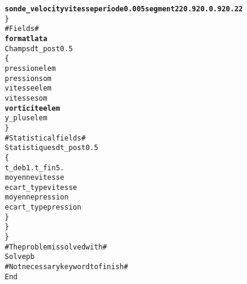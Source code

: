 \begin{alltt}
            {\bf{sonde_velocity  vitesse    periode 0.005   segment 22 0.92 0. 0.92 0.22 }}
        \} 
        # Fields # 
        {\bf{format lata }}
        Champs dt_post 0.5 
        \{ 
            pression elem 
            pression som 
            vitesse elem 
            vitesse som 
            {\bf{vorticite elem}}
            y_plus elem 
        \} 
        # Statistical fields # 
        Statistiques dt_post 0.5 
        \{ 
            t_deb 1. t_fin 5. 
            moyenne vitesse 
            ecart_type vitesse 
            moyenne pression 
            ecart_type pression 
        \} 
    \}  
\} 
# The problem is solved with # 
Solve pb 
# Not necessary keyword to finish # 
End 
\end{alltt}
